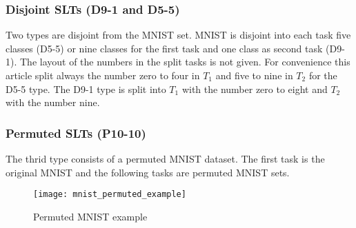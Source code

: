 \subsubsection*{Disjoint SLTs (D9-1 and D5-5)}

Two types are disjoint from the MNIST set.
MNIST is disjoint into each task five classes (D5-5) or nine classes for the first task and one class as second task (D9-1).
The layout of the numbers in the split tasks is not given.
For convenience this article split always the number zero to four in $T_1$ and five to nine in $T_2$ for the D5-5 type.
The D9-1 type is split into $T_1$ with the number zero to eight and $T_2$ with the number nine.

\subsubsection*{Permuted SLTs (P10-10)}

The thrid type consists of a permuted MNIST dataset.
The first task is the original MNIST and the following tasks are permuted MNIST sets.

\begin{figure}[H]
    \centering
    \texttt{[image: mnist\_permuted\_example]}
    \caption{Permuted MNIST example}
    \label{fig:intro_mnist_permuted_example}
\end{figure}
